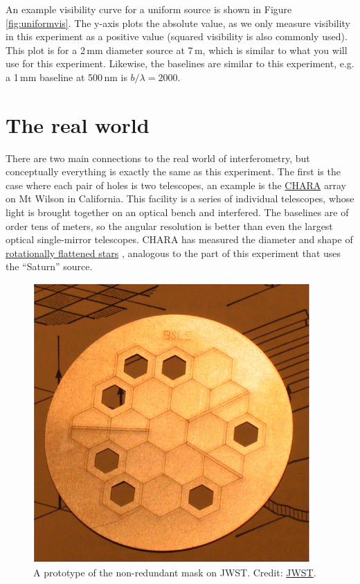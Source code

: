 \documentclass[11pt]{article}
\begin{document}
An example visibility curve for a uniform source is shown in Figure \ref{fig:uniformvis}. The y-axis plots the absolute value, as we only measure visibility in this experiment as a positive value (squared visibility is also commonly used). This plot is for a 2\,mm diameter source at 7\,m, which is similar to what you will use for this experiment. Likewise, the baselines are similar to this experiment, e.g. a 1\,mm baseline at 500\,nm is $b/\lambda=2000$.

\clearpage
\section{The real world}\label{sec:realworld}

There are two main connections to the real world of interferometry, but conceptually everything is exactly the same as this experiment. The first is the case where each pair of holes is two telescopes, an example is the \href{https://en.wikipedia.org/wiki/CHARA_array}{CHARA} array on Mt Wilson in California. This facility is a series of individual telescopes, whose light is brought together on an optical bench and interfered. The baselines are of order tens of meters, so the angular resolution is better than even the largest optical single-mirror telescopes.
CHARA has measured the diameter and shape of \href{https://www.chara.gsu.edu/science-highlights/rapid-rotators}{rotationally flattened stars} \citep[e.g.][]{2011ApJ...732...68C}, analogous to the part of this experiment that uses the ``Saturn'' source.

\begin{figure}
    \centering
    \includegraphics{doc/NIRISS_AMI.png}
    \caption{A prototype of the non-redundant mask on JWST. Credit: \href{https://jwst-docs.stsci.edu/jwst-near-infrared-imager-and-slitless-spectrograph/niriss-observing-modes/niriss-aperture-masking-interferometry}{JWST}.}
    \label{fig:ami}
\end{figure}
\end{document}
